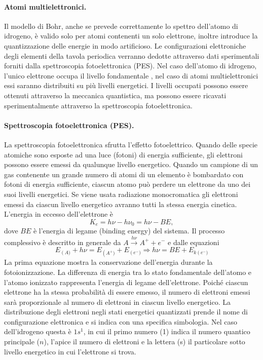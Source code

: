 \paragraph{Atomi multielettronici.} Il modello di Bohr, anche se prevede correttamente lo spettro dell'atomo di idrogeno, è valido solo per atomi contenenti un solo elettrone, inoltre introduce la quantizzazione delle energie in modo artificioso. Le configurazioni elettroniche degli elementi della tavola periodica verranno dedotte attraverso dati sperimentali forniti dalla spettroscopia fotoelettronica (PES). Nel caso dell'atomo di idrogeno, l'unico elettrone occupa il livello fondamentale , nel caso di atomi multielettronici essi saranno distribuiti su più livelli energetici. I livelli occupati possono essere ottenuti attraverso la meccanica quantistica, ma possono essere ricavati sperimentalmente attraverso la spettroscopia fotoelettronica.
\paragraph{Spettroscopia fotoelettronica (PES).} La spettroscopia fotoelettronica sfrutta l'effetto fotoelettrico.  Quando delle specie atomiche sono esposte ad una luce (fotoni) di energia sufficiente, gli elettroni possono essere emessi da qualunque livello energetico. Quando un campione di un gas contenente un grande numero di atomi di un elemento è bombardato con fotoni di energia sufficiente, ciascun atomo può perdere un elettrone da uno dei suoi livelli energetici. Se viene usata radiazione monocromatica gli elettroni emessi da ciascun livello energetico avranno tutti la stessa energia cinetica.
L'energia in eccesso dell'elettrone è
\begin{equation}
    K_e=h\nu-h\nu_0=h\nu-BE,
\end{equation}
dove $BE$ è l'energia di legame (binding energy) del sistema. Il processo complessivo è descritto in generale da $A\xrightarrow{h\nu}A^+ + e^-$ e dalle equazioni
\begin{equation}
    E_{\left(A\right.)}+h\nu=E_{\left(A^+\right.)}+E_{\left(e^-\right.)}\Rightarrow h\nu=BE+E_{k\left(e^-\right.)}
\end{equation}
La prima equazione mostra la conservazione dell'energia durante la fotoionizzazione. La differenza di energia tra lo stato fondamentale dell'atomo e l'atomo ionizzato rappresenta l'energia di legame dell'elettrone. Poiché ciascun elettrone ha la stessa probabilità di essere emesso, il numero di elettroni emessi sarà proporzionale al numero di elettroni in ciascun livello energetico. La distribuzione degli elettroni negli stati energetici quantizzati prende il nome di configurazione elettronica e si indica con una specifica simbologia. Nel caso dell'idrogeno questa è $1s^1$, in cui il primo numero (1) indica il numero quantico principale ($n$), l'apice il numero di elettroni e la lettera (s) il particolare sotto livello energetico in cui l'elettrone si trova.

